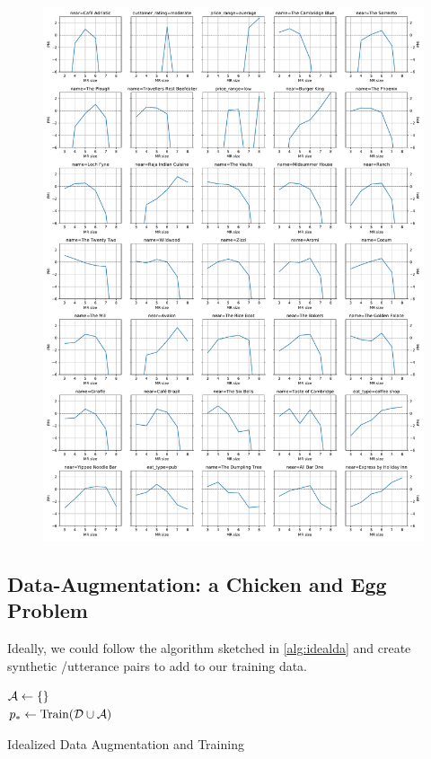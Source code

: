 \begin{figure}[p]
    \includegraphics[width=\textwidth]{nlg/trainpmis.pdf}
\end{figure}


\clearpage
\subsection{Data-Augmentation: a Chicken and Egg Problem}

Ideally, we could follow the algorithm  sketched in \autoref{alg:idealda} 
and create synthetic
\meaningrepresentation/utterance pairs to add to our training data.

\begin{algorithm}[t]
${\mathcal{A}} \gets \{\}$\\
\While{$\setsize{\augdata} < \numSamples$}{
$\tilde{\mr} \sim \daMrDist$ \\
$\boldsymbol{\tilde{\utttoks}} \sim \daUttDist(\boldsymbol{\tilde{\mr}})$\\
$\augdata \gets \augdata \cup \{(\tilde{\mr}, \boldsymbol{\tilde{\utttoks}}) \}$
}
$p_* \gets \operatorname{Train}(\mathcal{D} \cup {\ensuremath{\mathcal{A}}})$\\
\KwResult{$\gen_*$}
    \caption{Idealized Data Augmentation and Training}
\label{alg:idealda}
\end{algorithm}

